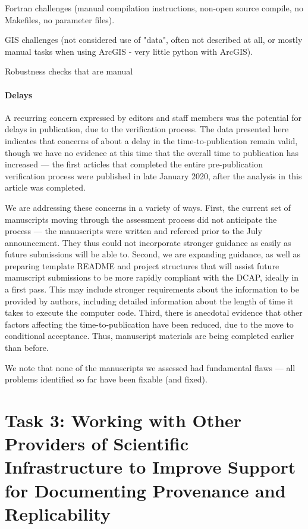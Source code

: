 \documentclass[PP]{AEA}
\begin{document}
Fortran challenges (manual compilation instructions, non-open source compile, no Makefiles, no parameter files).

GIS challenges (not considered use of "data", often not described at all, or mostly manual tasks when using ArcGIS - very little python with ArcGIS). 

Robustness checks that are manual

\paragraph{Delays} A recurring concern expressed by editors and staff members was the potential for   delays in publication, due to the verification process. The data presented here indicates that concerns of about a delay in the time-to-publication remain valid, though we have no evidence at this time that the overall time to publication has increased --- the first articles that completed the entire pre-publication verification process were published in late January 2020, after the analysis in this article was completed.

We are addressing these concerns in a variety of ways. First, the current set of manuscripts moving through the assessment process did not anticipate the process --- the manuscripts were written and refereed prior to the July announcement. They thus could not incorporate stronger guidance as easily as future submissions will be able to. Second, we are expanding guidance, as well as preparing template README and project structures that will assist future manuscript submissions to be more rapidly compliant with the \ac{DCAP}, ideally in a first pass. This may include stronger requirements about the information to be provided by authors, including detailed information about the length of time it takes to execute the computer code.
Third, there is anecdotal evidence that other factors affecting the time-to-publication have been reduced, due to the move to conditional acceptance. Thus, manuscript materials are being completed earlier than before. 

We note that none of the \jiramcs{} manuscripts we assessed had  fundamental flaws --- all problems identified so far have been fixable (and fixed). 





\section{Task 3: Working with Other Providers of Scientific Infrastructure to Improve Support for Documenting Provenance and Replicability}
\label{sec:coordination}
\end{document}
